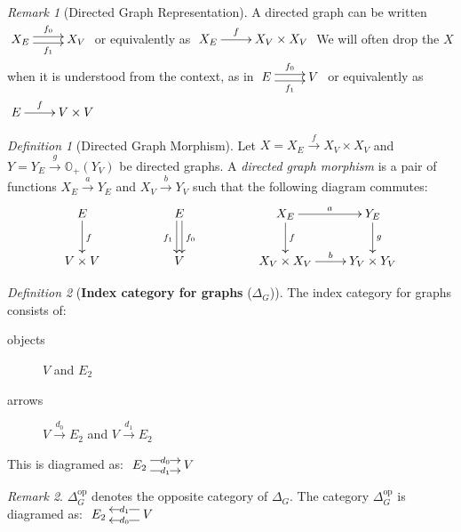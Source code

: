 \documentclass[10pt]{article}
\newcommand{\onearrow}[3]{\mbox{$#1 \stackrel{#2}{\longrightarrow} #3$}}
\theoremstyle{remark}
\newtheorem{definition}{Definition}
\newtheorem{remark}{Remark}
\begin{document}
\begin{remark}[Directed Graph Representation]
A directed graph can be written
$\xymatrix{
     X_E \ar@<0.6ex>[r]^-{f_0} \ar@<-0.6ex>[r]_-{f_1} & X_V
}$
or equivalently as
$\xymatrix{
     X_E \ar[r]^-{f} & X_V \times X_V
}$
We will often drop the $X$ when it is understood from the context, as in
$\xymatrix{
     E \ar@<0.6ex>[r]^-{f_0} \ar@<-0.6ex>[r]_-{f_1} & V
}$
or equivalently as
$\xymatrix{
     E \ar[r]^-{f} & V \times V
}$
\end{remark}

\begin{definition}[Directed Graph Morphism]
Let $X=\onearrow{X_E}{f}{X_V \times X_V}$ and $Y=\onearrow{Y_E}{g}{\mathbb{O}_{+} (Y_V)}$ be directed graphs. A \emph{directed graph morphism} is a pair of functions \onearrow{X_E}{a}{Y_E} and \onearrow{X_V}{b}{Y_V} such that the following diagram commutes:
$$\xymatrix{
E \ar[d]^f & & E  \ar@<-0.5ex>[d]_{f_1} \ar@<0.5ex>[d]^{f_0} & & X_E  \ar[d]^f \ar[r]^-a  & Y_E  \ar[d]^g \\ 
V \times V & &V & &  X_V \times X_V   \ar[r]^-b       & Y_V \times Y_V
}$$
\end{definition}

\begin{definition}[\textbf{Index category for graphs} ($\Delta_G$)]
The index category for graphs consists of:
\begin{description}
\item [objects] $V$ and $E_2$
\item [arrows] \onearrow{V}{d_0}{E_2} and \onearrow{V}{d_1}{E_2}
\end{description}

This is diagramed as:
$\xymatrix{
     E_2 \ar@<1ex>[r]|-{d_0} \ar@<-1ex>[r]|-{d_1} & V
     }$
\end{definition}

\begin{remark}
$\Delta_G^{\text{op}}$ denotes the opposite category of $\Delta_G$.
The category $\Delta_G^{\text{op}}$ is diagramed as:
$\xymatrix{
     E_2 & V \ar@<1ex>[l]|-{d_0} \ar@<-1ex>[l]|-{d_1}
     }$
\end{remark}
\end{document}

